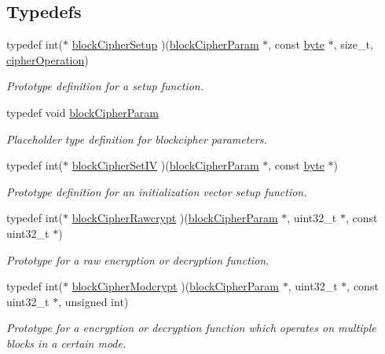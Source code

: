 \subsection*{Typedefs}
\begin{CompactItemize}
\item 
typedef int($\ast$ \hyperlink{group__BC__m_ga0}{block\-Cipher\-Setup} )(\hyperlink{group__BC__m_ga1}{block\-Cipher\-Param} $\ast$, const \hyperlink{beecrypt_8api_8h_a3}{byte} $\ast$, size\_\-t, \hyperlink{beecrypt_8h_a73}{cipher\-Operation})
\begin{CompactList}\small\item\em Prototype definition for a setup function. \item\end{CompactList}\item 
typedef void \hyperlink{group__BC__m_ga1}{block\-Cipher\-Param}
\begin{CompactList}\small\item\em Placeholder type definition for blockcipher parameters. \item\end{CompactList}\item 
typedef int($\ast$ \hyperlink{group__BC__m_ga2}{block\-Cipher\-Set\-IV} )(\hyperlink{group__BC__m_ga1}{block\-Cipher\-Param} $\ast$, const \hyperlink{beecrypt_8api_8h_a3}{byte} $\ast$)
\begin{CompactList}\small\item\em Prototype definition for an initialization vector setup function. \item\end{CompactList}\item 
typedef int($\ast$ \hyperlink{group__BC__m_ga3}{block\-Cipher\-Rawcrypt} )(\hyperlink{group__BC__m_ga1}{block\-Cipher\-Param} $\ast$, uint32\_\-t $\ast$, const uint32\_\-t $\ast$)
\begin{CompactList}\small\item\em Prototype for a {\em raw\/} encryption or decryption function. \item\end{CompactList}\item 
typedef int($\ast$ \hyperlink{group__BC__m_ga4}{block\-Cipher\-Modcrypt} )(\hyperlink{group__BC__m_ga1}{block\-Cipher\-Param} $\ast$, uint32\_\-t $\ast$, const uint32\_\-t $\ast$, unsigned int)
\begin{CompactList}\small\item\em Prototype for a {\em encryption\/} or decryption function which operates on multiple blocks in a certain mode. \item\end{CompactList}\end{CompactItemize}


